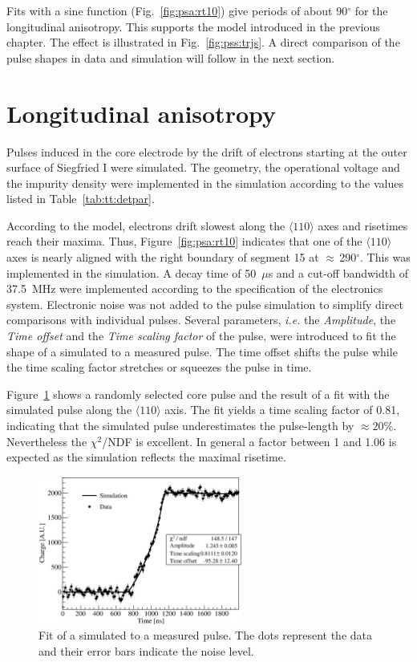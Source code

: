Fits with a sine function (Fig.~\ref{fig:psa:rt10}) give periods of
about 90$^{\circ}$ for the longitudinal anisotropy. This supports the
model introduced in the previous chapter. The effect is illustrated in
Fig.~\ref{fig:pss:trjs}. A direct comparison of the pulse shapes in
data and simulation will follow in the next section.

\section{Longitudinal anisotropy}
\label{sec:psa:lon}
Pulses induced in the core electrode by the drift of electrons
starting at the outer surface of Siegfried I were simulated. The
geometry, the operational voltage and the impurity density were
implemented in the simulation according to the values listed in
Table~\ref{tab:tt:detpar}.

According to the model, electrons drift slowest along the $\langle 110
\rangle$ axes and risetimes reach their maxima. Thus,
Figure~\ref{fig:psa:rt10} indicates that one of the $\langle 110
\rangle$ axes is nearly aligned with the right boundary of segment 15
at $\approx$\,290$^\circ$. This was implemented in the simulation. A
decay time of 50~$\mu$s and a cut-off bandwidth of 37.5~MHz were
implemented according to the specification of the electronics
system. Electronic noise was not added to the pulse simulation to
simplify direct comparisons with individual pulses. Several
parameters, \textit{i.e.} the \emph{Amplitude}, the \emph{Time offset}
and the \emph{Time scaling factor} of the pulse, were introduced to
fit the shape of a simulated to a measured pulse. The time offset
shifts the pulse while the time scaling factor stretches or squeezes
the pulse in time.

Figure~\ref{fig:psa:s2d} shows a randomly selected core pulse and the
result of a fit with the simulated pulse along the $\langle 110
\rangle$ axis. The fit yields a time scaling factor of 0.81,
indicating that the simulated pulse underestimates the pulse-length by
$\approx 20\%$. Nevertheless the $\chi^{2}$/NDF is excellent. In
general a factor between 1 and 1.06 is expected as the simulation
reflects the maximal risetime.
\begin{figure}[htbp]
\centering
\includegraphics[width=0.6\textwidth]{PSs2d}
\caption{Fit of a simulated to a measured pulse. The dots represent
the data and their error bars indicate the noise level.}
\label{fig:psa:s2d}
\end{figure}

